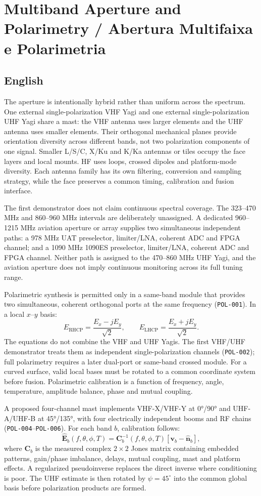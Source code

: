 \chapter{Multiband Aperture and Polarimetry / Abertura Multifaixa e Polarimetria}

\section*{English}
The aperture is intentionally hybrid rather than uniform across the spectrum. One external single-polarization VHF Yagi and one external single-polarization UHF Yagi share a mast: the VHF antenna uses larger elements and the UHF antenna uses smaller elements. Their orthogonal mechanical planes provide orientation diversity across different bands, not two polarization components of one signal. Smaller L/S/C, X/Ku and K/Ka antennas or tiles occupy the face layers and local mounts. HF uses loops, crossed dipoles and platform-mode diversity. Each antenna family has its own filtering, conversion and sampling strategy, while the face preserves a common timing, calibration and fusion interface.

The first demonstrator does not claim continuous spectral coverage. The 323--470 MHz and 860--960 MHz intervals are deliberately unassigned. A dedicated 960--1215 MHz aviation aperture or array supplies two simultaneous independent paths: a 978 MHz UAT preselector, limiter/LNA, coherent ADC and FPGA channel; and a 1090 MHz 1090ES preselector, limiter/LNA, coherent ADC and FPGA channel. Neither path is assigned to the 470--860 MHz UHF Yagi, and the aviation aperture does not imply continuous monitoring across its full tuning range.

Polarimetric synthesis is permitted only in a same-band module that provides two simultaneous, coherent orthogonal ports at the same frequency (\texttt{POL-001}). In a local $x$--$y$ basis:
\[
E_{\mathrm{RHCP}}=\frac{E_x-jE_y}{\sqrt{2}},\qquad E_{\mathrm{LHCP}}=\frac{E_x+jE_y}{\sqrt{2}}.
\]
The equations do not combine the VHF and UHF Yagis. The first VHF/UHF demonstrator treats them as independent single-polarization channels (\texttt{POL-002}); full polarimetry requires a later dual-port or same-band crossed module. For a curved surface, valid local bases must be rotated to a common coordinate system before fusion. Polarimetric calibration is a function of frequency, angle, temperature, amplitude balance, phase and mutual coupling.

A proposed four-channel mast implements VHF-X/VHF-Y at 0°/90° and UHF-A/UHF-B at 45°/135°, with four electrically independent booms and RF chains (\texttt{POL-004}--\texttt{POL-006}). For each band $b$, calibration follows:
\[
\widehat{\mathbf{E}}_b(f,\theta,\phi,T)=
\mathbf{C}_b^{-1}(f,\theta,\phi,T)
\left[\mathbf{v}_b-\widehat{\mathbf{n}}_b\right],
\]
where $\mathbf{C}_b$ is the measured complex $2\times2$ Jones matrix containing embedded patterns, gain/phase imbalance, delays, mutual coupling, mast and platform effects. A regularized pseudoinverse replaces the direct inverse where conditioning is poor. The UHF estimate is then rotated by $\psi=45^\circ$ into the common global basis before polarization products are formed.

